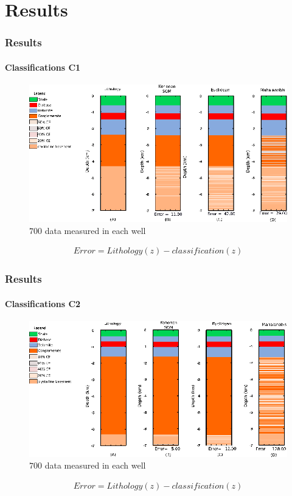 \documentclass[aspectratio=10]{beamer} %
\begin{document}




\section{Results}

\begin{frame}
\frametitle{Results}
\framesubtitle{Classifications C1}
	\begin{figure}[H]
		\centering
		 \includegraphics[scale=0.35]{Imagens/IDC1020118.eps}
		\caption{$700$ data measured in each well}
		\label{C1}
	\end{figure}
	\pause
\begin{eqnarray}
	Error=Lithology(z)-classification(z) \nonumber
\end{eqnarray}
\end{frame}

\begin{frame}
\frametitle{Results}
\framesubtitle{Classifications C2}
	\begin{figure}[H]
		\centering
		\includegraphics[scale=0.35]{Imagens/IDC2020118.eps}
        \caption{$700$ data measured in each well}
		\label{C2}
	\end{figure}
		\pause
		\begin{eqnarray}
		Error=Lithology(z)-classification(z) \nonumber
		\end{eqnarray}
\end{frame}
\end{document}
